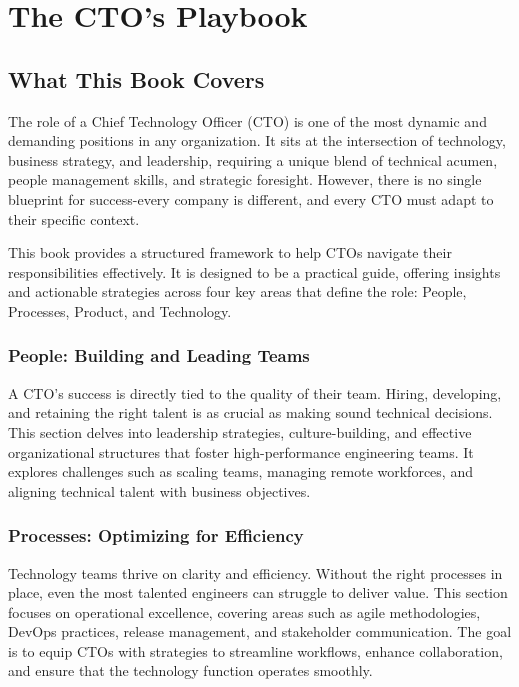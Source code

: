\chapter{The CTO's Playbook}

\section{What This Book Covers}

The role of a Chief Technology Officer (CTO) is one of the most dynamic and demanding positions in any organization. It sits at the intersection of technology, business strategy, and leadership, requiring a unique blend of technical acumen, people management skills, and strategic foresight. However, there is no single blueprint for success-every company is different, and every CTO must adapt to their specific context.

This book provides a structured framework to help CTOs navigate their responsibilities effectively. It is designed to be a practical guide, offering insights and actionable strategies across four key areas that define the role: People, Processes, Product, and Technology.

\subsection{People: Building and Leading Teams}

A CTO's success is directly tied to the quality of their team. Hiring, developing, and retaining the right talent is as crucial as making sound technical decisions. This section delves into leadership strategies, culture-building, and effective organizational structures that foster high-performance engineering teams. It explores challenges such as scaling teams, managing remote workforces, and aligning technical talent with business objectives.

\subsection{Processes: Optimizing for Efficiency}

Technology teams thrive on clarity and efficiency. Without the right processes in place, even the most talented engineers can struggle to deliver value. This section focuses on operational excellence, covering areas such as agile methodologies, DevOps practices, release management, and stakeholder communication. The goal is to equip CTOs with strategies to streamline workflows, enhance collaboration, and ensure that the technology function operates smoothly.

